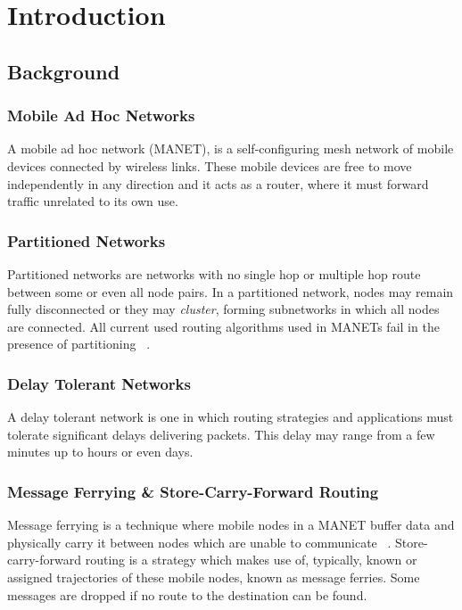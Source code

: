 \chapter{Introduction} 

\section{Background}

\subsection{Mobile Ad Hoc Networks}
A mobile ad hoc network (MANET),  is a self-configuring mesh network of mobile devices connected by wireless links.  
These mobile devices are free to move independently in any direction and it acts as a router, where it must forward traffic unrelated to its own use.

\subsection{Partitioned Networks}
Partitioned networks are networks with no single hop or multiple hop route between some or even all node pairs. %
In a partitioned network, nodes may remain fully disconnected or they may \emph{cluster}, forming subnetworks in which all nodes are connected.
All current used routing algorithms used in MANETs %
fail in the presence of partitioning ~\cite{Routing}.

\subsection{Delay Tolerant Networks}
\label{sec:delay_loss_tolerant}
A delay tolerant network is one in which routing strategies and applications must tolerate significant delays delivering packets.
This delay may range from a few minutes up to hours or even days. %


\subsection{Message Ferrying \& Store-Carry-Forward Routing}
\label{sec:ferrying_overview}
Message ferrying is a technique where mobile nodes in a MANET buffer data and physically carry it between nodes which are unable to communicate ~\cite{adhocmsgferry}.
Store-carry-forward routing is a strategy which makes use of, typically, known or assigned trajectories of these mobile nodes, known as message ferries.
Some messages are dropped if no route to the destination can be found.  

